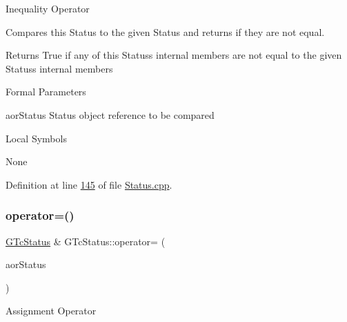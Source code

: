 Inequality Operator

Compares this Status to the given Status and returns if they are not equal.

\begin{DoxyReturn}{Returns}
True if any of this Status\textquotesingle{}s internal members are not equal to the given Status\textquotesingle{}s internal members
\end{DoxyReturn}
\begin{DoxyParagraph}{Formal Parameters}

\begin{DoxyPre}{\ttfamily [ in ]  aorStatus    Status object reference to be compared }\end{DoxyPre}

\end{DoxyParagraph}
\begin{DoxyParagraph}{Local Symbols}

\begin{DoxyPre}{\ttfamily  None }\end{DoxyPre}
 
\end{DoxyParagraph}


Definition at line \mbox{\hyperlink{_status_8cpp_source_l00145}{145}} of file \mbox{\hyperlink{_status_8cpp_source}{Status.\+cpp}}.

\mbox{\label{class_g_n_common_1_1_g_n_notification_1_1_g_tc_status_a5e0b5d58cf5c0f12bf78f2d06289c879}} 
\subsubsection{\texorpdfstring{operator=()}{operator=()}}
{\footnotesize\ttfamily \mbox{\hyperlink{class_g_n_common_1_1_g_n_notification_1_1_g_tc_status}{G\+Tc\+Status}} \& G\+Tc\+Status\+::operator= (\begin{DoxyParamCaption}\item[{const \mbox{\hyperlink{class_g_n_common_1_1_g_n_notification_1_1_g_tc_status}{G\+Tc\+Status}} \&}]{aor\+Status }\end{DoxyParamCaption})}

Assignment Operator

